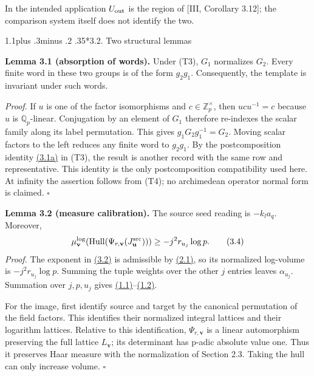 \documentclass[11pt,a4paper]{amsart}
\makeatletter
\renewcommand\subsection{\@startsection{subsection}{2}{\z@}
{1.1\baselineskip plus .3\baselineskip minus .2\baselineskip}
{.35\baselineskip}{\normalfont\bfseries}}
\makeatother
\begin{document}
In the intended application $U_{\rm out}$ is the region of [III, Corollary 3.12]; the comparison system itself does not identify the two.


\subsection*{3.2. Two structural lemmas}

\par\smallskip\noindent\textbf{Lemma 3.1 (absorption of words).} Under (T3), $G_1$ normalizes $G_2$. Every finite word in these two groups is of the form $g_2g_1$. Consequently, the template is invariant under such words.


\emph{Proof.} If $u$ is one of the factor isomorphisms and $c\in\mathbb Z_p^\times$, then $ucu^{-1}=c$ because $u$ is $\mathbb Q_p$-linear. Conjugation by an element of $G_1$ therefore re-indexes the scalar family along its label permutation. This gives $g_1G_2g_1^{-1}=G_2$. Moving scalar factors to the left reduces any finite word to $g_2g_1$. By the postcomposition identity \hyperref[eq:3.1a]{(3.1a)} in (T3), the result is another record with the same row and representative. This identity is the only postcomposition compatibility used here. At infinity the assertion follows from (T4); no archimedean operator normal form is claimed. \hfill$\square$


\par\smallskip\noindent\textbf{Lemma 3.2 (measure calibration).} The source seed reading is $-k_la_q$. Moreover,
\begin{equation}
\begin{gathered}
\mu_{\mathbf v}^{\log}(\operatorname{Hull}(\Psi_{r,\mathbf v}(J^{\rm src}_{\mathbf u})))
\ge-j^2r_{u_j}\log p.
\end{gathered}
\tag{3.4}\label{eq:3.4}
\end{equation}
\emph{Proof.} The exponent in \hyperref[eq:3.2]{(3.2)} is admissible by \hyperref[eq:2.1]{(2.1)}, so its normalized log-volume is $-j^2r_{u_j}\log p$. Summing the tuple weights over the other $j$ entries leaves $\alpha_{u_j}$. Summation over $j,p,u_j$ gives \hyperref[eq:1.1]{(1.1)}--\hyperref[eq:1.2]{(1.2)}.


For the image, first identify source and target by the canonical permutation of the field factors. This identifies their normalized integral lattices and their logarithm lattices. Relative to this identification, $\Psi_{r,\mathbf v}$ is a linear automorphism preserving the full lattice $L_{\mathbf v}$; its determinant has p-adic absolute value one. Thus it preserves Haar measure with the normalization of Section 2.3. Taking the hull can only increase volume. \hfill$\square$
\end{document}
